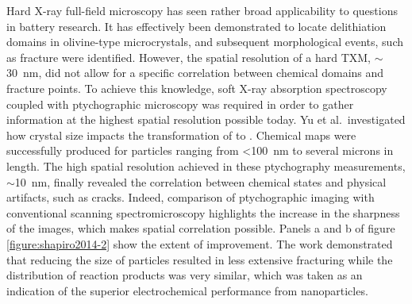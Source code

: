 \documentclass[journal=cmatex,manuscript=perspective]{achemso}
\begin{document}
Hard X-ray full-field microscopy has seen rather broad applicability
to questions in battery research. It has effectively been demonstrated
to locate delithiation domains in olivine-type 
microcrystals, and subsequent morphological events, such as fracture
were identified\cite{boesenberg2013}. However, the spatial resolution
of a hard TXM, $\sim$\SI{30}{nm}, did not allow for a specific
correlation between chemical domains and fracture points. To achieve
this knowledge, soft X-ray absorption spectroscopy coupled with
ptychographic microscopy was required in order to gather information
at the highest spatial resolution possible today. Yu et
al.\ investigated how crystal size impacts the transformation of
 to \cite{yu2015-2}. Chemical maps were
successfully produced for particles ranging from <\SI{100}{nm} to
several microns in length. The high spatial resolution achieved in
these ptychography measurements, $\sim$\SI{10}{nm}, finally revealed
the correlation between chemical states and physical artifacts, such
as cracks. Indeed, comparison of ptychographic imaging with
conventional scanning spectromicroscopy highlights the increase in the
sharpness of the images, which makes spatial correlation
possible. Panels a and b of figure \ref{figure:shapiro2014-2}
show the extent of improvement\cite{shapiro2014}. The work
demonstrated that reducing the size of  particles resulted
in less extensive fracturing while the distribution of reaction
products was very similar, which was taken as an indication of the
superior electrochemical performance from 
nanoparticles\cite{yu2015-2}.
\end{document}
